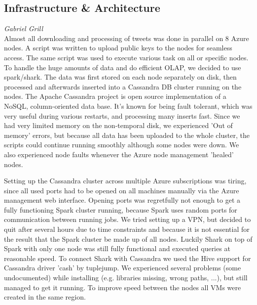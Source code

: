 \subsection*{Infrastructure \& Architecture}
\emph{Gabriel Grill} \\
Almost all downloading and processing of tweets was done in parallel on 8 Azure nodes. A script was written to upload public keys to the nodes for seamless access. The same script was used to execute various task on all or specific nodes. To handle the huge amounts of data and do efficient OLAP, we decided to use spark/shark. The data was first stored on each node separately on disk, then processed and afterwards inserted into a Cassandra DB cluster running on the nodes. The Apache Cassandra project is open source implementation of a NoSQL, column-oriented data base. It's known for being fault tolerant, which was very useful during various restarts, and processing many inserts fast. Since we had very limited memory on the non-temporal disk, we experienced 'Out of memory' errors, but because all data has been uploaded to the whole cluster, the scripts could continue running smoothly although some nodes were down. We also experienced node faults whenever the Azure node management 'healed' nodes.

Setting up the Cassandra cluster across multiple Azure subscriptions was tiring, since all used ports had to be opened on all machines manually via the Azure management web interface. Opening ports was regretfully not enough to get a fully functioning Spark cluster running, because Spark uses random ports for communication between running jobs. We tried setting up a VPN, but decided to quit after several hours due to time constraints and because it is not essential for the result that the Spark cluster be made up of all nodes. Luckily Shark on top of Spark with only one node was still fully functional and executed queries at reasonable speed. To connect Shark with Cassandra we used the Hive support for Cassandra driver 'cash' by tuplejump. We experienced several problems (some undocumented) while installing (e.g. libraries missing, wrong paths, ...), but still managed to get it running. To improve speed between the nodes all VMs were created in the same region.
